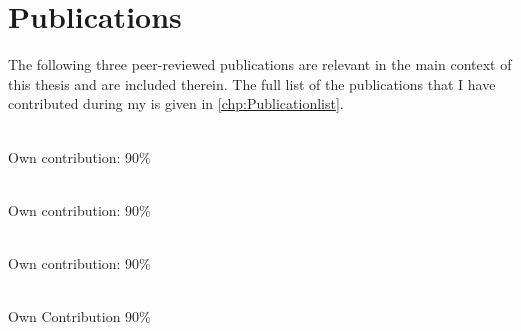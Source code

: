 \noindent
 
\chapter*{Publications}


The following three peer-reviewed publications are relevant in the main context of this thesis and are included therein. The full list of the publications that I have contributed during my is given in \autoref{chp:Publicationlist}.\\


\noindent{}\\ \strut \hfill Own contribution: 90\%\\

\noindent{}\\ \strut \hfill Own contribution: 90\%\\

\noindent{}\\ \strut \hfill Own contribution: 90\%\\
\noindent{}\\ \strut \hfill Own Contribution 90\%\\



